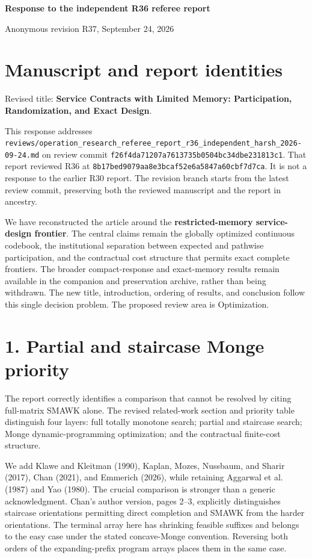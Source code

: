 \documentclass[11pt,letterpaper]{article}
\theoremstyle{definition}\newtheorem{assumption}[theorem]{Assumption}
\begin{document}
\begin{center}{\Large\bfseries Response to the independent R36 referee report}\par\medskip Anonymous revision R37, September 24, 2026\end{center}

\section*{Manuscript and report identities}

Revised title: \textbf{Service Contracts with Limited Memory: Participation, Randomization, and Exact Design}.

This response addresses \texttt{reviews/\allowbreak{}operation\_\allowbreak{}research\_\allowbreak{}referee\_\allowbreak{}report\_\allowbreak{}r36\_\allowbreak{}independent\_\allowbreak{}harsh\_\allowbreak{}2026-\allowbreak{}09-\allowbreak{}24.\allowbreak{}md} on review commit \texttt{f26f4da71207a7613735b0504bc34dbe231813c1}. That report reviewed R36 at \texttt{8b17bed9079aa8e3bcaf52e6a5847a60cbf7d7ca}. It is not a response to the earlier R30 report. The revision branch starts from the latest review commit, preserving both the reviewed manuscript and the report in ancestry.

We have reconstructed the article around the \textbf{restricted-memory service-design frontier}. The central claims remain the globally optimized continuous codebook, the institutional separation between expected and pathwise participation, and the contractual cost structure that permits exact complete frontiers. The broader compact-response and exact-memory results remain available in the companion and preservation archive, rather than being withdrawn. The new title, introduction, ordering of results, and conclusion follow this single decision problem. The proposed review area is Optimization.

\section*{1. Partial and staircase Monge priority}

The report correctly identifies a comparison that cannot be resolved by citing full-matrix SMAWK alone. The revised related-work section and priority table distinguish four layers: full totally monotone search; partial and staircase search; Monge dynamic-programming optimization; and the contractual finite-cost structure.

We add Klawe and Kleitman (1990), Kaplan, Mozes, Nussbaum, and Sharir (2017), Chan (2021), and Emmerich (2026), while retaining Aggarwal et al. (1987) and Yao (1980). The crucial comparison is stronger than a generic acknowledgment. Chan's author version, pages 2–3, explicitly distinguishes staircase orientations permitting direct completion and SMAWK from the harder orientations. The terminal array here has shrinking feasible suffixes and belongs to the easy case under the stated concave-Monge convention. Reversing both orders of the expanding-prefix program arrays places them in the same case.
\end{document}
